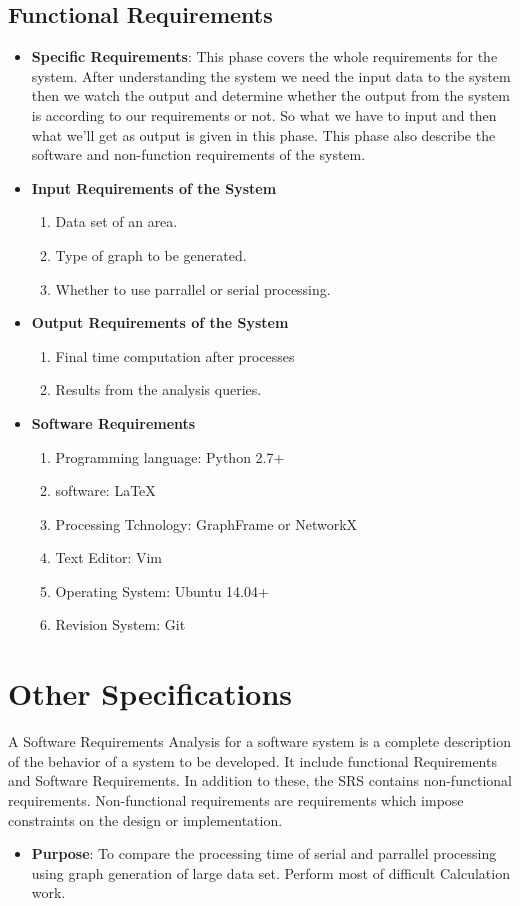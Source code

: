 \subsection{Functional Requirements}
\begin{itemize}
\item {\bf Specific Requirements}: This phase covers the whole requirements 
for the system. After understanding the system we need the input data 
to the system then we watch the output and determine whether the output 
from the system is according to our requirements or not. So what we have 
to input and then what we'll get as output is given in this phase. This 
phase also describe the software and non-function requirements of the 
system.
\item {\bf Input Requirements of the System}
\begin{enumerate} 
\item Data set of an area.
\item Type of graph to be generated.
\item Whether to use parrallel or serial processing.
\end{enumerate}
\vskip 0.5cm
\item {\bf Output Requirements of the System}
\begin{enumerate} 
\item Final time computation after processes
\item Results from the analysis queries. 
\end{enumerate}
\vskip 0.5cm
\item {\bf Software Requirements}
\begin{enumerate} 
\item Programming language: Python 2.7+
\item software: \LaTeX{}
\item Processing Tchnology: GraphFrame or NetworkX 
\item Text Editor: Vim
\item Operating System: Ubuntu 14.04+
\item Revision System: Git
\end{enumerate}
\end{itemize}

\section{Other Specifications}

A Software Requirements Analysis for a software system is a complete 
description of the behavior of a system to be developed. It include functional Requirements
and Software Requirements. In addition to these, the SRS contains 
non-functional requirements. Non-functional requirements are 
requirements which impose constraints on the design or implementation.
\begin{itemize}
\item{\bf Purpose}: To compare the processing time of serial and parrallel processing using graph generation of large data set.
Perform most of difficult Calculation work.
\end{itemize}


